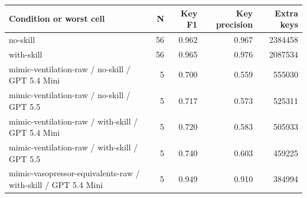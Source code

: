 \begin{tabular}{lrrrr}
\toprule
Condition or worst cell & N & Key F1 & Key precision & Extra keys \\
\midrule
no-skill & 56 & 0.962 & 0.967 & 2384458 \\
with-skill & 56 & 0.965 & 0.976 & 2087534 \\
mimic-ventilation-raw / no-skill / GPT 5.4 Mini & 5 & 0.700 & 0.559 & 555030 \\
mimic-ventilation-raw / no-skill / GPT 5.5 & 5 & 0.717 & 0.573 & 525311 \\
mimic-ventilation-raw / with-skill / GPT 5.4 Mini & 5 & 0.720 & 0.583 & 505933 \\
mimic-ventilation-raw / with-skill / GPT 5.5 & 5 & 0.740 & 0.603 & 459225 \\
mimic-vasopressor-equivalents-raw / with-skill / GPT 5.4 Mini & 5 & 0.949 & 0.910 & 384994 \\
\bottomrule
\end{tabular}
